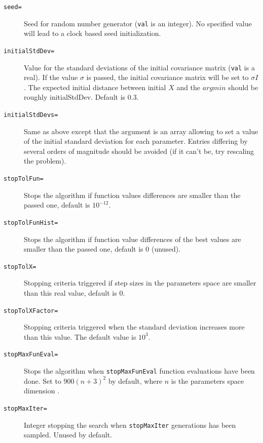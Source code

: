 \documentclass[a4paper,twoside,12pt]{book}
\begin{document}
\begin{description}

    \item[\texttt{seed=}] Seed for random number generator  
    ({\tt val} is an integer). No specified value will lead to a clock based seed initialization.
    
    \item[\texttt{initialStdDev=}] Value for the standard deviations of the initial covariance matrix 
    ({\tt val} is a real). If the value $\sigma$ is passed, the initial covariance matrix will be set to $\sigma I$. The 
            expected initial distance between initial $X$ and the $argmin$
            should be roughly initialStdDev. Default is $0.3$.
    
    \item[\texttt{initialStdDevs=}] Same as above except that the argument is an array allowing to set a value of the initial standard deviation
    for each parameter. Entries differing by several orders of magnitude should be avoided (if it can't be, try rescaling the problem).
    
    \item[\texttt{stopTolFun=}]  Stops the algorithm if function values differences are smaller than the passed one, default is $10^{-12}$.
    
    \item[\texttt{stopTolFunHist=}]  Stops the algorithm if function value differences of the best values are smaller than the passed one, default is $0$ (unused).
    
    \item[\texttt{stopTolX=}]  Stopping criteria triggered if step sizes in the parameters space are 
                 smaller than this real value, default is $0$.
                 
    \item[\texttt{stopTolXFactor=}]  Stopping criteria triggered when the standard deviation increases more than this value. The default value is $10^{3}$.
       
    \item[\texttt{stopMaxFunEval=}]  Stops the algorithm when {\tt stopMaxFunEval} function evaluations have been done. Set to $900(n+3)^{2}$ by default, where $n$ is the parameters space dimension .
                 
    \item[\texttt{stopMaxIter=}]  Integer stopping the search when {\tt stopMaxIter} generations has been sampled. Unused by default.
    

\end{description}
\end{document}
